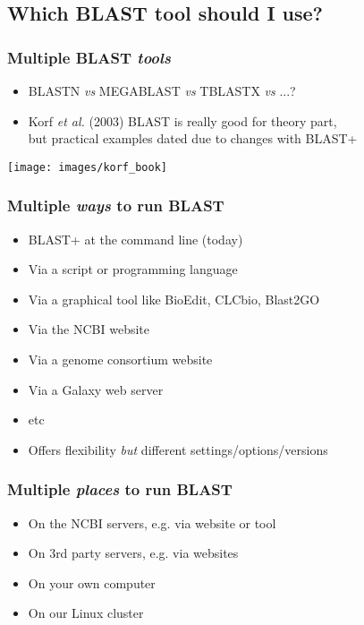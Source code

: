 %

\subsection{Which BLAST tool should I use?}
\begin{frame}
  \frametitle{Multiple BLAST \textit{tools}}
  \begin{itemize}
    \item BLASTN \textit{vs} MEGABLAST \textit{vs} TBLASTX \textit{vs} ...?
    \item Korf \textit{et al.} (2003) BLAST is really good for theory part, \\
             but practical examples dated due to changes with BLAST+
  \end{itemize}
  \begin{center}
    \texttt{[image: images/korf\_book]}
  \end{center}
\end{frame}

\begin{frame}
  \frametitle{Multiple \textit{ways} to run BLAST}
  \begin{itemize}
    \item BLAST+ at the command line (today)
    \item Via a script or programming language
    \item Via a graphical tool like BioEdit, CLCbio, Blast2GO
    \item Via the NCBI website
    \item Via a genome consortium website
    \item Via a Galaxy web server
    \item etc
    \item Offers flexibility \textit{but} different settings/options/versions
  \end{itemize}
\end{frame}

\begin{frame}
  \frametitle{Multiple \textit{places} to run BLAST}
  \begin{itemize}
    \item On the NCBI servers, e.g. via website or tool
    \item On 3rd party servers, e.g. via websites
    \item On your own computer
    \item On our Linux cluster
  \end{itemize}
\end{frame}

